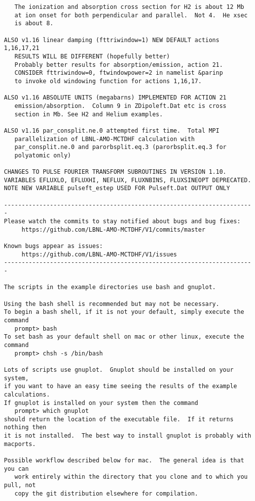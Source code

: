 \begin{verbatim}
   The ionization and absorption cross section for H2 is about 12 Mb 
   at ion onset for both perpendicular and parallel.  Not 4.  He xsec
   is about 8.

ALSO v1.16 linear damping (fttriwindow=1) NEW DEFAULT actions 1,16,17,21
   RESULTS WILL BE DIFFERENT (hopefully better)
   Probably better results for absorption/emission, action 21.
   CONSIDER fttriwindow=0, ftwindowpower=2 in namelist &parinp
   to invoke old windowing function for actions 1,16,17.

ALSO v1.16 ABSOLUTE UNITS (megabarns) IMPLEMENTED FOR ACTION 21
   emission/absorption.  Column 9 in ZDipoleft.Dat etc is cross 
   section in Mb. See H2 and Helium examples.

ALSO v1.16 par_consplit.ne.0 attempted first time.  Total MPI 
   parallelization of LBNL-AMO-MCTDHF calculation with
   par_consplit.ne.0 and parorbsplit.eq.3 (parorbsplit.eq.3 for 
   polyatomic only)

CHANGES TO PULSE FOURIER TRANSFORM SUBROUTINES IN VERSION 1.10.
VARIABLES EFLUXLO, EFLUXHI, NEFLUX, FLUXNBINS, FLUXSINEOPT DEPRECATED.
NOTE NEW VARIABLE pulseft_estep USED FOR Pulseft.Dat OUTPUT ONLY

-----------------------------------------------------------------------
Please watch the commits to stay notified about bugs and bug fixes:
     https://github.com/LBNL-AMO-MCTDHF/V1/commits/master

Known bugs appear as issues:
     https://github.com/LBNL-AMO-MCTDHF/V1/issues
-----------------------------------------------------------------------

The scripts in the example directories use bash and gnuplot.  

Using the bash shell is recommended but may not be necessary.
To begin a bash shell, if it is not your default, simply execute the command
   prompt> bash
To set bash as your default shell on mac or other linux, execute the command
   prompt> chsh -s /bin/bash

Lots of scripts use gnuplot.  Gnuplot should be installed on your system,
if you want to have an easy time seeing the results of the example calculations.
If gnuplot is installed on your system then the command
   prompt> which gnuplot
should return the location of the executable file.  If it returns nothing then
it is not installed.  The best way to install gnuplot is probably with macports.

Possible workflow described below for mac.  The general idea is that you can 
   work entirely within the directory that you clone and to which you pull, not 
   copy the git distribution elsewhere for compilation.


\end{verbatim}
